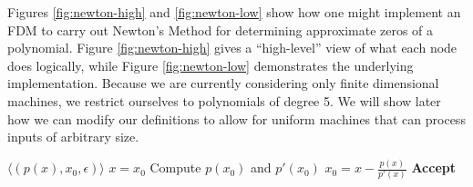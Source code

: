 



\begin{example}
  Figures \ref{fig:newton-high} and \ref{fig:newton-low} show how one
  might implement an FDM to carry out Newton's Method for determining
  approximate zeros of a polynomial.  Figure \ref{fig:newton-high}
  gives a ``high-level'' view of what each node does logically, while
  Figure \ref{fig:newton-low} demonstrates the underlying
  implementation.  Because we are currently considering only finite
  dimensional machines, we restrict ourselves to polynomials of degree
  5.  We will show later how we can modify our definitions to allow
  for uniform machines that can process inputs of arbitrary size.
\end{example}

\bigskip
\begin{minipage}{0.5\linewidth}
  \begin{center}
    \begin{algorithmic}
      \Large
      \Require $\langle (p(x), x_0, \epsilon) \rangle$
      \State $x = x_0$
      \State Compute $p(x_0)$ and $p'(x_0)$
      \State $x_0 = x - \frac{p(x)}{p'(x)}$
      \EndWhile
      \State \textbf{Accept}
    \end{algorithmic}
  \end{center}
\end{minipage}
\begin{minipage}{0.5\linewidth}
  \begin{center}
    \newtonhigh{}
  \end{center}
\end{minipage}
 \label{fig:newton-high}
\bigskip

